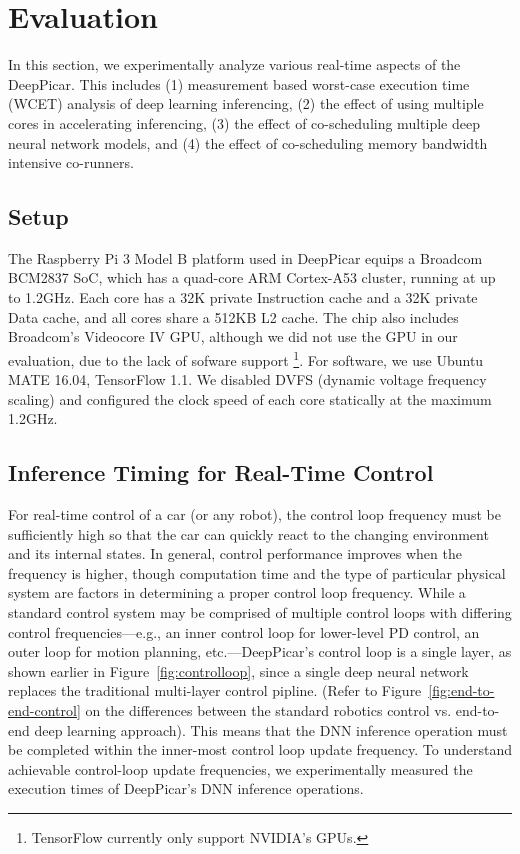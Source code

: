 
\section{Evaluation}\label{sec:evaluation}

In this section, we experimentally analyze various real-time aspects
of the DeepPicar. This includes
(1) measurement based worst-case execution time (WCET) analysis of
deep learning inferencing,
(2) the effect of using multiple cores in accelerating inferencing,
(3) the effect of co-scheduling multiple deep neural network models,
and 
(4) the effect of co-scheduling memory bandwidth intensive co-runners.

\subsection{Setup}

The Raspberry Pi 3 Model B platform used in DeepPicar equips a Broadcom
BCM2837 SoC, which has a quad-core ARM Cortex-A53 cluster,
running at up to 1.2GHz. Each core has a 32K private Instruction cache
and a 32K private Data cache, and all cores share a 512KB L2 cache.
The chip also includes Broadcom's Videocore IV GPU, although we did
not use the GPU in our evaluation, due to the lack of sofware support
\footnote{TensorFlow currently only support NVIDIA's GPUs.}.
For software, we use Ubuntu MATE 16.04, TensorFlow 1.1.
We disabled DVFS (dynamic voltage frequency scaling) and
configured the clock speed of each core statically at the maximum 1.2GHz.

\subsection{Inference Timing for Real-Time Control}

For real-time control of a car (or any robot), the control loop
frequency must be sufficiently high so that the car can quickly
react to the changing environment and its internal states. In general,
control performance improves when the frequency is higher, though
computation time and the type of particular physical system are
factors in determining a proper control loop frequency. While a standard
control system may be comprised of multiple control loops with
differing control frequencies---e.g., an inner control loop for lower-level
PD control, an outer loop for motion planning, etc.---DeepPicar's
control loop is a single layer, as shown earlier in
Figure~\ref{fig:controlloop}, since a single deep neural network
replaces the traditional multi-layer control pipline. (Refer to
Figure~\ref{fig:end-to-end-control} on the differences between the
standard robotics control vs. end-to-end deep learning approach).
This means that the DNN inference operation must be completed
within the inner-most control loop update frequency. To understand
achievable control-loop update frequencies, we experimentally measured
the execution times of DeepPicar's DNN inference operations.

